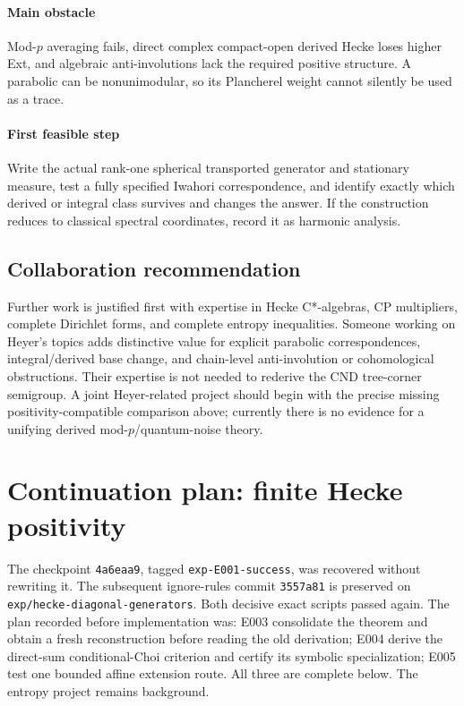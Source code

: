 \documentclass[11pt]{article}
\theoremstyle{remark}\newtheorem{remark}[definition]{Remark}
\begin{document}
\paragraph{Main obstacle} Mod-$p$ averaging fails, direct complex
compact-open derived Hecke loses higher Ext, and algebraic anti-involutions
lack the required positive structure. A parabolic can be nonunimodular,
so its Plancherel weight cannot silently be used as a trace.
\paragraph{First feasible step} Write the actual rank-one spherical
transported generator and stationary measure, test a fully specified
Iwahori correspondence, and identify exactly which derived or integral
class survives and changes the answer. If the construction reduces to
classical spectral coordinates, record it as harmonic analysis.

\subsection{Collaboration recommendation}
Further work is justified first with expertise in Hecke C*-algebras,
CP multipliers, complete Dirichlet forms, and complete entropy inequalities.
Someone working on Heyer's topics adds distinctive value for explicit
parabolic correspondences, integral/derived base change, and chain-level
anti-involution or cohomological obstructions. Their expertise is not
needed to rederive the CND tree-corner semigroup. A joint Heyer-related
project should begin with the precise missing positivity-compatible
comparison above; currently there is no evidence for a unifying derived
mod-$p$/quantum-noise theory.

\section{Continuation plan: finite Hecke positivity}
The checkpoint \texttt{4a6eaa9}, tagged \texttt{exp-E001-success}, was recovered
without rewriting it. The subsequent ignore-rules commit \texttt{3557a81}
is preserved on \texttt{exp/hecke-diagonal-generators}. Both decisive exact
scripts passed again. The plan recorded before implementation was: E003
consolidate the theorem and obtain a fresh reconstruction before reading the
old derivation; E004 derive the direct-sum conditional-Choi criterion and
certify its symbolic specialization; E005 test one bounded affine extension
route. All three are complete below. The entropy project remains background.
\end{document}
